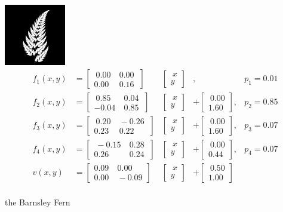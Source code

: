 \documentclass[11pt]{article}
\begin{document}
\begin{ifs}
\centering
\includegraphics[width=0.2\textwidth]{figures/barnsley_100000000}
$$ 
\begin{aligned}
f_1(x,y) &= \begin{bmatrix} \ 0.00 & \ 0.00 \ \\ 0.00 & \ 0.16 \end{bmatrix}  & \begin{bmatrix} \ x \\ y \end{bmatrix} & , &p_1 = 0.01 \\
f_2(x,y) &= \begin{bmatrix} \ 0.85 & \ 0.04 \ \\ -0.04 & \ 0.85 \end{bmatrix} & \begin{bmatrix} \ x \\ y \end{bmatrix} &+ \begin{bmatrix} \ 0.00 \\ 1.60 \end{bmatrix} , &p_2 = 0.85 \\
f_3(x,y) &= \begin{bmatrix} \ 0.20 & \ -0.26 \ \\ 0.23 & \ 0.22 \end{bmatrix} & \begin{bmatrix} \ x \\ y \end{bmatrix} &+ \begin{bmatrix} \ 0.00 \\ 1.60 \end{bmatrix} , &p_3 = 0.07 \\
f_4(x,y) &= \begin{bmatrix} \ -0.15 & \ 0.28 \ \\ 0.26 & \ 0.24 \end{bmatrix} & \begin{bmatrix} \ x \\ y \end{bmatrix} &+ \begin{bmatrix} \ 0.00 \\ 0.44 \end{bmatrix} , &p_4 = 0.07 \\
v(x, y) &= \begin{bmatrix} 0.09 & \ 0.00 \\ 0.00 & \ -0.09 \end{bmatrix} & \begin{bmatrix} \ x \\ y \end{bmatrix} &+ \begin{bmatrix} \ 0.50 \\ 1.00 \end{bmatrix} \\
\end{aligned}
$$
\caption{the Barnsley Fern}
\label{ifs:barnsley_fern}
\end{ifs}
\end{document}

